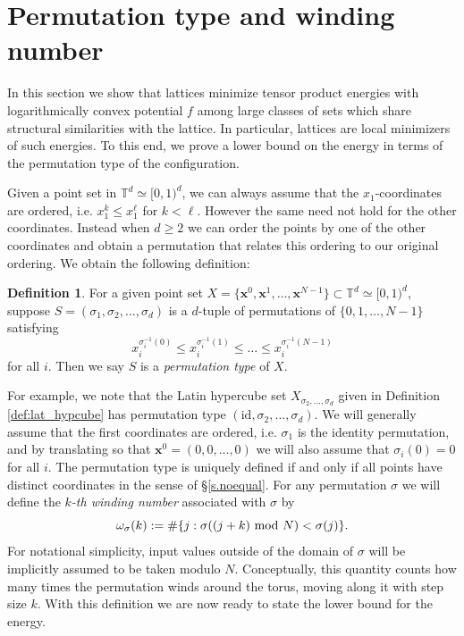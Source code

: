 \documentclass[a4paper,12pt]{article}
\numberwithin{equation}{section}
\theoremstyle{definition}
\newtheorem{defi}[thm]{Definition}
\newcommand{\bx}{\mathbf{x}}
\begin{document}
\section{Permutation type and winding number}\label{s.type}

In this section  we show that lattices minimize tensor product energies with logarithmically convex potential $f$  among large classes of sets which share structural similarities with the lattice. In particular, lattices are local minimizers of such energies. To this end, we prove a lower bound on the energy in terms of the permutation type of the configuration. 


Given a point set in  $\mathbb T^d \simeq[0,1)^d$, we can always assume that the $x_1$-coordinates are ordered, i.e. $x_1^k\le x_1^\ell$ for $k<\ell$. However the same need not hold for the other coordinates. Instead when $d\ge 2$ we can order the points by one of the other coordinates and obtain a permutation that relates this ordering to our original ordering. We obtain the following definition:
\begin{defi}\label{def.perm_type}
    For a given point set $X = \{ \bx^0, \bx^1, \dots, \bx^{N-1} \} \subset \mathbb T^d \simeq[0,1)^d$, suppose $S=(\sigma_1,\sigma_2,\dots,\sigma_d)$ is a $d$-tuple of permutations of $\{0,1,\dots,N-1\}$ satisfying
    $$
    x_i^{\sigma^{-1}_i(0)}\le x_i^{\sigma^{-1}_i(1)}\le\dots\le x_i^{\sigma^{-1}_i(N-1)}
    $$
    for all $i$. Then we say $S$ is a \emph{permutation type} of $X$.
\end{defi}

For example, we note that the Latin hypercube set $X_{\sigma_2,...,\sigma_d}$ given in Definition \ref{def:lat_hypcube} has permutation type $(\text{id},\sigma_2,...,\sigma_d)$. We will generally assume that the first coordinates are ordered, i.e. $\sigma_1$ is the identity permutation, and by translating so that $\bx^0=(0,0,...,0)$ we will also assume that $\sigma_i(0)=0$ for all $i$. The permutation type is uniquely defined if and only if all points have distinct coordinates in the sense of §\ref{s.noequal}. For any permutation $\sigma$ we will define the \emph{$k$-th winding number} associated with $\sigma$ by $$\omega_\sigma(k):=\#\{j:\sigma((j+k) \textup{ mod } N)<\sigma(j)\}.$$ %
For notational simplicity,  input values outside of the domain of $\sigma$ will be implicitly assumed to be taken modulo $N$. Conceptually, this quantity counts how many times the permutation winds around the torus, moving along it with step size $k$. With this definition we are now ready to state the lower bound for the energy.
\end{document}
